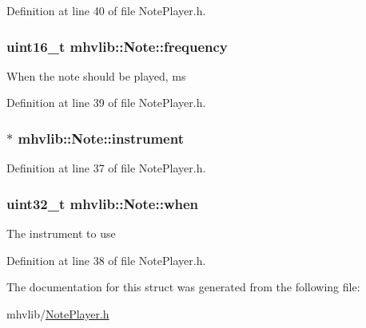 Definition at line 40 of file Note\-Player.\-h.

\hypertarget{structmhvlib_1_1_note_a29b0c3643a51dd13e1b213c92feab31d}{
\subsubsection[{frequency}]{\setlength{\rightskip}{0pt plus 5cm}uint16\-\_\-t mhvlib\-::\-Note\-::frequency}}\label{structmhvlib_1_1_note_a29b0c3643a51dd13e1b213c92feab31d}
When the note should be played, ms 

Definition at line 39 of file Note\-Player.\-h.

\hypertarget{structmhvlib_1_1_note_a58b2618885a7861d7c657543433ff58f}{
\subsubsection[{instrument}]{$\ast$ mhvlib\-::\-Note\-::instrument}}\label{structmhvlib_1_1_note_a58b2618885a7861d7c657543433ff58f}


Definition at line 37 of file Note\-Player.\-h.

\hypertarget{structmhvlib_1_1_note_a05011cabe9b47a1d0384e10edc30dd2f}{
\subsubsection[{when}]{\setlength{\rightskip}{0pt plus 5cm}uint32\-\_\-t mhvlib\-::\-Note\-::when}}\label{structmhvlib_1_1_note_a05011cabe9b47a1d0384e10edc30dd2f}
The instrument to use 

Definition at line 38 of file Note\-Player.\-h.



The documentation for this struct was generated from the following file\-:\begin{DoxyCompactItemize}
\item 
mhvlib/\hyperlink{_note_player_8h}{Note\-Player.\-h}\end{DoxyCompactItemize}
